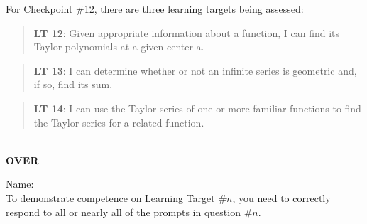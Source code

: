 \documentclass[11 pt]{article}
\begin{document}
 For Checkpoint \#12, there are three learning targets being assessed: 


\begin{quote}
{\bf LT 12}:  Given appropriate information about a function, I can find its Taylor polynomials at a given center a.
\end{quote}

\begin{quote}
{\bf LT 13}:  I can determine whether or not an infinite series is geometric and, if so, find its sum.
\end{quote}

\begin{quote}
{\bf LT 14}: I can use the Taylor series of one or more familiar functions to find the Taylor series for a related function.
\end{quote}

\noindent \hrulefill \\

\vfill \hfill {\bf OVER} 

\pagebreak

\noindent Name: \\ 

\noindent To demonstrate competence on Learning Target \#$n$, you need to correctly respond to all or nearly all of the prompts in question \#$n$.  
\end{document}
